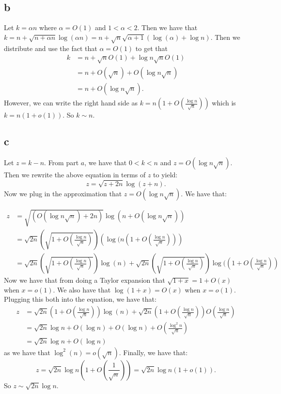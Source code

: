 \documentclass[]{article}
\begin{document}
\subsection{b}
Let $k = \alpha n$ where $\alpha = O(1)$ and $1 < \alpha < 2$. 
Then we have that 
$k = n + \sqrt{n + \alpha n} \log (\alpha n) = n + \sqrt{n} \sqrt{\alpha + 1} (\log(\alpha) + \log n)$. Then we distribute and use the fact that $\alpha = O(1)$ to get that
\begin{align*}
	k &= n + \sqrt{n} O(1) + \log n \sqrt{n} O(1)\\
	 &= n + O(\sqrt{n}) + O(\log n \sqrt{n})\\
	 &= n + O(\log n \sqrt n).
\end{align*}
However, we can write the right hand side as $k = n(1 + O(\frac{\log n}{\sqrt{n}}))$ which is $k = n(1 + o(1))$. So $k \sim n$. 
\subsection{c}
Let $z = k - n$. From part $a$, we have that $0 < k < n$ and $z =  O(\log n \sqrt n)$. Then we rewrite the above equation in terms of $z$ to yield:
\begin{equation}
	z = \sqrt{z + 2n} \log (z + n).
\end{equation}
Now we plug in the approximation that $z = O(\log n \sqrt{n})$. We have that:

\begin{align*}
	z &= \sqrt{(O(\log n \sqrt{n}) + 2n)}\log(n + O(\log n \sqrt n))\\
	&= \sqrt{2n} \left(\sqrt{1 + O(\frac{\log n}{\sqrt{n}})}\right) \left(\log( n(1 + O(\frac{\log n}{\sqrt{n}} )) \right)\\
	&= \sqrt{2n}\left(\sqrt{1 + O(\frac{\log n}{\sqrt{n}})}\right) \log(n) + \sqrt{2n}\left(\sqrt{1 + O(\frac{\log n}{\sqrt{n}})}\right) \log((1 + O(\frac{\log n}{\sqrt{n}}))
	\end{align*}
Now we have that from doing a Taylor expansion that $\sqrt{1 + x} = 1 + O(x)$ when $x = o(1)$. We also have that $\log(1 + x) = O(x)$ when $x = o(1)$. Plugging this both into the equation, we have that:
\begin{align*}
	z &= \sqrt{2n}(1 + O(\frac{\log n}{\sqrt{n}})) \log(n) + \sqrt{2n}(1 + O(\frac{\log n}{\sqrt{n}}))O(\frac{\log n}{\sqrt{n}})\\
	&= \sqrt{2n} \log n + O(\log n) + O(\log n) + O(\frac{\log^2 n}{\sqrt{n}})\\
	&= \sqrt{2n} \log n + O(\log n)
\end{align*}
as we have that $\log^2(n) = o(\sqrt{n})$. Finally, we have that:
\begin{equation}
	z = \sqrt{2n} \log n ( 1 + O(\frac{1}{\sqrt{n}})) = \sqrt{2n} \log n (1 + o(1)).
\end{equation}
So $z \sim \sqrt{2n} \log n$.
\end{document}
